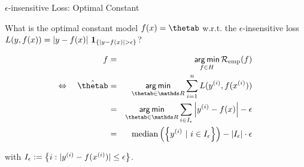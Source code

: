 \begin{vbframe}{$\epsilon$-insensitive Loss: Optimal Constant}

What is the optimal constant model $\fx = \thetab$ w.r.t. the $\epsilon$-insensitive loss $L(y, f(x)) =  |y - f(x)| ~ \mathbf{1}_{ \left\{|y - f(x)| > \epsilon \right\}}$?

\vspace{-0.2cm}
\begin{eqnarray*}
f &=& \argmin_{f \in \Hspace} \riskef\\
\Leftrightarrow \quad\hat \thetab&=& \argmin_{\thetab\in \R}\sumin \Lxyi \\
&=& \argmin_{\thetab\in \R} \sum_{i \in I_\eps} \left| \yi - \fx \right| - \eps  \\
&=& \text{median}\left(\left\{\yi ~|~ i \in I_\eps\right\}\right) - |I_\eps| \cdot \eps \\
\end{eqnarray*}

with $I_\epsilon := \left\{i: |y^{(i)} - f(x^{(i)})| \le \epsilon \right\}$.


% 
%   
% 

\end{vbframe}

